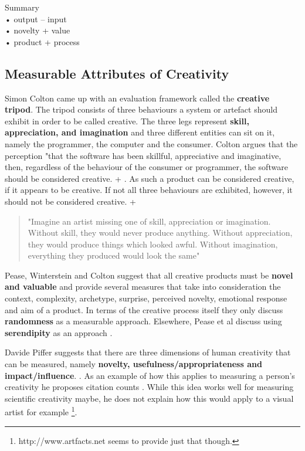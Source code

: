 \begin{shaded}
  Summary\\
  •	output – input\\
  •	novelty + value\\
  •	product + process
\end{shaded}

\subsection{Measurable Attributes of Creativity}

Simon Colton came up with an evaluation framework called the \textbf{creative tripod}. The tripod consists of three behaviours a system or artefact should exhibit in order to be called creative. The three legs represent \textbf{skill, appreciation, and imagination} and three different entities can sit on it, namely the programmer, the computer and the consumer. Colton argues that the perception "that the software has been skillful, appreciative and imaginative, then, regardless of the behaviour of the consumer or programmer, the software should be considered creative. \citep[p.5]{Colton2008a} + \citep[p.5]{Colton2008}. As such a product can be considered creative, if it appears to be creative. If not all three behaviours are exhibited, however, it should not be considered creative. \citep[p.5]{Colton2008a} + \citep[p.5]{Colton2008}

\begin{quote}
  "Imagine an artist missing one of skill, appreciation or imagination. Without skill, they would never produce anything. Without appreciation, they would produce things which looked awful. Without imagination, everything they produced would look the same" \citep{Colton2008a}
\end{quote}

Pease, Winterstein and Colton suggest that all creative products must be \textbf{novel and valuable} \citep[p.1]{Pease2001} and provide several measures that take into consideration the context, complexity, archetype, surprise, perceived novelty, emotional response and aim of a product. In terms of the creative process itself they only discuss \textbf{randomness} as a measurable approach. Elsewhere, Pease et al discuss using \textbf{serendipity} as an approach \citep{Pease2013}.

Davide Piffer suggests that there are three dimensions of human creativity that can be measured, namely \textbf{novelty, usefulness/appropriateness and impact/influence}. \citep[p.258-259]{Piffer2012}. As an example of how this applies to measuring a person’s creativity he proposes citation counts \citep[p.261]{Piffer2012}. While this idea works well for measuring scientific creativity maybe, he does not explain how this would apply to a visual artist for example \footnote{http://www.artfacts.net seems to provide just that though.}.

